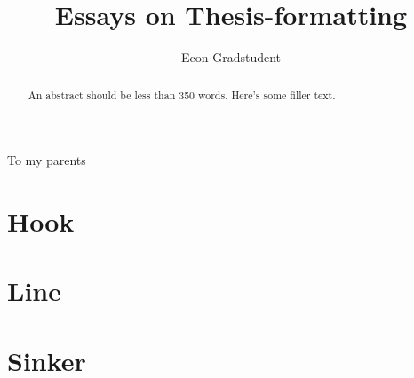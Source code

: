 \documentclass[12pt]{gsasthesis} %
\title{Essays on Thesis-formatting}
\author{Econ Gradstudent} %
\begin{document}


\thesistitlepage
\copyrightpage
\begin{abstract}
  An abstract should be less than 350 words. Here's some filler text. \blindtext
\end{abstract}
\tableofcontents %

\listoftables
\listoffigures
\begin{acknowledgments}
  \blindtext
\end{acknowledgments}
\begin{dedication}
  To my parents
\end{dedication}



\chapter{Hook}\label{ch:1}


\chapter{Line}\label{ch:2}


\chapter{Sinker}\label{ch:3}




\begin{singlespacing}
  \renewcommand{\bibname}{References}

  
  
\end{singlespacing}


\end{document}

